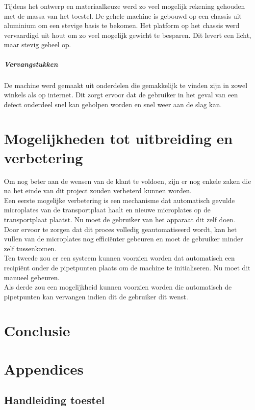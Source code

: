 \documentclass[a4paper,twoside,kulak]{kulakreport} %
\begin{document}
Tijdens het ontwerp en materiaalkeuze werd zo veel mogelijk rekening gehouden met de massa van het toestel. De gehele machine is gebouwd op een chassis uit aluminium om een stevige basis te bekomen. Het platform op het chassis werd vervaardigd uit hout om zo veel mogelijk gewicht te besparen. Dit levert een licht, maar stevig geheel op. 

\paragraph{Vervangstukken}

De machine werd gemaakt uit onderdelen die gemakkelijk te vinden zijn in zowel winkels als op internet. Dit zorgt ervoor dat de gebruiker in het geval van een defect onderdeel snel kan geholpen worden en snel weer aan de slag kan.

\chapter{Mogelijkheden tot uitbreiding en verbetering}

Om nog beter aan de wensen van de klant te voldoen, zijn er nog enkele zaken die na het einde van dit project zouden verbeterd kunnen worden. \\
Een eerste mogelijke verbetering is een mechanisme dat automatisch gevulde microplates  van de transportplaat haalt en nieuwe microplates op de transportplaat plaatst. Nu moet de gebruiker van het apparaat dit zelf doen. Door ervoor te zorgen dat dit proces volledig geautomatiseerd wordt, kan het vullen van de microplates nog efficiënter gebeuren en moet de gebruiker minder zelf tussenkomen. \\
Ten tweede zou er een systeem kunnen voorzien worden dat automatisch een recipiënt onder de pipetpunten plaats om de machine te initialiseren. Nu moet dit manueel gebeuren. \\
Als derde zou een mogelijkheid kunnen voorzien worden die automatisch de pipetpunten kan vervangen indien dit de gebruiker dit wenst.

\chapter{Conclusie}

\chapter*{Appendices}

\section*{Handleiding toestel}
\end{document}
